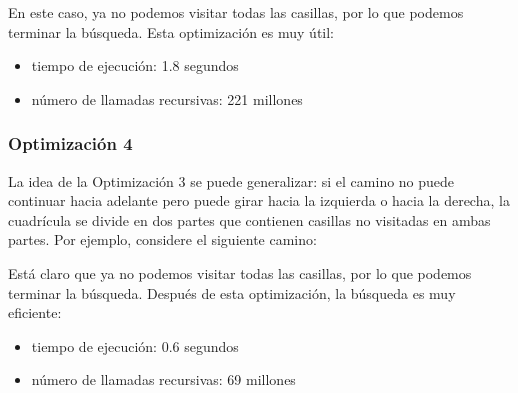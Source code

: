 \begin{center}
\end{center}
En este caso, ya no podemos visitar todas las casillas,
por lo que podemos terminar la búsqueda.
Esta optimización es muy útil:

\begin{itemize}
\item
tiempo de ejecución: 1.8 segundos
\item
número de llamadas recursivas: 221 millones
\end{itemize}

\subsubsection{Optimización 4}

La idea de la Optimización 3
se puede generalizar:
si el camino no puede continuar hacia adelante
pero puede girar hacia la izquierda o hacia la derecha,
la cuadrícula se divide en dos partes
que contienen casillas no visitadas en ambas partes.
Por ejemplo, considere el siguiente camino:

\begin{center}
\end{center}
Está claro que ya no podemos visitar todas las casillas,
por lo que podemos terminar la búsqueda.
Después de esta optimización, la búsqueda es
muy eficiente:

\begin{itemize}
\item
tiempo de ejecución: 0.6 segundos
\item
número de llamadas recursivas: 69 millones
\end{itemize}

